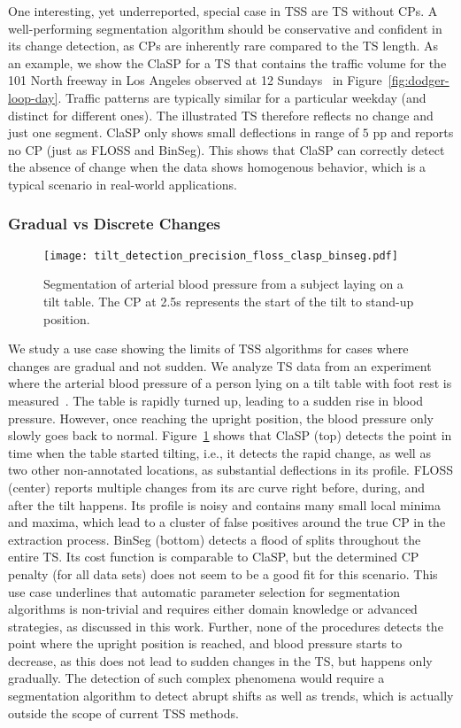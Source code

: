 \documentclass[pdflatex,sn-basic]{sn-jnl}
\begin{document}
One interesting, yet underreported, special case in TSS are TS without CPs. A well-performing segmentation algorithm should be conservative and confident in its change detection, as CPs are inherently rare compared to the TS length. As an example, we show the ClaSP for a TS that contains the traffic volume for the 101 North freeway in Los Angeles observed at 12 Sundays~\citep{Ihler2006AdaptiveED} in Figure~\ref{fig:dodger-loop-day}. Traffic patterns are typically similar for a particular weekday (and distinct for different ones). The illustrated TS therefore reflects no change and just one segment. ClaSP only shows small deflections in range of $5$ pp and reports no CP (just as FLOSS and BinSeg). This shows that ClaSP can correctly detect the absence of change when the data shows homogenous behavior, which is a typical scenario in real-world applications.

\subsubsection*{Gradual vs Discrete Changes}

\begin{figure}[t]
	\texttt{[image: tilt\_detection\_precision\_floss\_clasp\_binseg.pdf]}
	\caption{Segmentation of arterial blood pressure from a subject laying on a tilt table. The CP at 2.5s represents the start of the tilt to stand-up position.\label{fig:tilt-abp}
	}
\end{figure}

We study a use case showing the limits of TSS algorithms for cases where changes are gradual and not sudden. We analyze TS data from an experiment where the arterial blood pressure of a person lying on a tilt table with foot rest is measured~\citep{heldt2003circulatory}. The table is rapidly turned up, leading to a sudden rise in blood pressure. However, once reaching the upright position, the blood pressure only slowly goes back to normal. Figure~\ref{fig:tilt-abp} shows that ClaSP (top) detects the point in time when the table started tilting, i.e., it detects the rapid change, as well as two other non-annotated locations, as substantial deflections in its profile. FLOSS (center) reports multiple changes from its arc curve right before, during, and after the tilt happens. Its profile is noisy and contains many small local minima and maxima, which lead to a cluster of false positives around the true CP in the extraction process. BinSeg (bottom) detects a flood of splits throughout the entire TS. Its cost function is comparable to ClaSP, but the determined CP penalty (for all data sets) does not seem to be a good fit for this scenario. This use case underlines that automatic parameter selection for segmentation algorithms is non-trivial and requires either domain knowledge or advanced strategies, as discussed in this work. Further, none of the procedures detects the point where the upright position is reached, and blood pressure starts to decrease, as this does not lead to sudden changes in the TS, but happens only gradually. The detection of such complex phenomena would require a segmentation algorithm to detect abrupt shifts as well as trends, which is actually outside the scope of current TSS methods.
\end{document}

